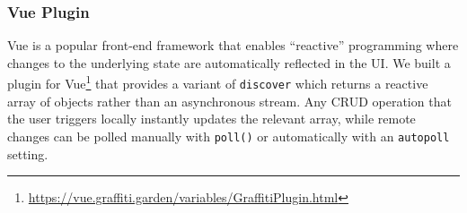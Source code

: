 








\subsubsection{Vue Plugin}

Vue is a popular front-end framework that enables ``reactive'' programming where
changes to the underlying state are automatically reflected in the UI.
We built a plugin for Vue\footnote{
  \url{https://vue.graffiti.garden/variables/GraffitiPlugin.html}
}
that provides a variant of
\texttt{discover} which returns a reactive array of objects rather than
an asynchronous stream.
Any CRUD operation that the user triggers locally instantly updates
the relevant array, while remote changes can be polled manually
with \texttt{poll()} or automatically
with an \texttt{autopoll} setting.

